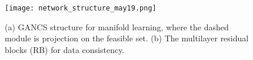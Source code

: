 \documentclass{journal}
\def \cN {\mathcal{N}}
\def \bPhi {\boldsymbol{\Phi}}
\def \bx {\mathbf{x}}
\def \bz {\mathbf{z}}
\def \bu {\mathbf{u}}
\def \bI {\mathbf{I}}
\def \bP {\mathbf{P}}
\begin{document}





\begin{figure}[t]
	\centering
	\hspace{-0.25cm}\texttt{[image: network\_structure\_may19.png]}
	\caption{(a) GANCS structure for manifold learning, where the dashed module is projection on the feasible set. (b) The multilayer residual blocks (RB) for data consistency. }
	\label{fig:fig_net}
\end{figure}
\end{document}
